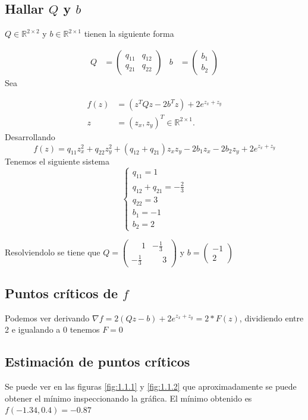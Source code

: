 \documentclass{endm}
\begin{document}
\subsection{Hallar $Q$ y $b$}
$Q \in \mathbb{R}^{2\times2}$ y $b \in \mathbb{R}^{2\times1}$ tienen la siguiente forma

\begin{align}
    Q &= \begin{pmatrix} q_{11} & q_{12} \\ q_{21} & q_{22} \end{pmatrix} & b &= \begin{pmatrix} b_1 \\ b_2 \end{pmatrix}
\end{align}
Sea

\begin{align} 
    f(z) &= (z^{T}Qz - 2b^{T}z) + 2e^{z_x+z_y} \\
    z &= (z_x,z_y)^T \in \mathbb{R}^{2\times1}.
\end{align}
Desarrollando
\begin{equation}
    f(z) = q_{11}z_x^2 + q_{22}z_y^2 + (q_{12} + q_{21})z_x z_y - 2b_1 z_x - 2b_2z_y + 2e^{z_x+z_y}
\end{equation}
Tenemos el siguiente sistema
\begin{equation}
\begin{cases}
q_{11} = 1 \\
q_{12} + q_{21} = -\frac{2}{3} \\
q_{22} = 3 \\
b_1 = -1 \\
b_2 = 2
\end{cases}
\end{equation}

Resolviendolo se tiene que
$Q =  \begin{pmatrix} \phantom{-}1 & -\frac{1}{3} \\ -\frac{1}{3} & \phantom{-}3\end{pmatrix} $
y
$b = \begin{pmatrix} -1\\ 2 \end{pmatrix}$
\subsection{Puntos críticos de $f$}
Podemos ver derivando $\nabla f = 2(Qz -b)+ 2e^{z_x+z_y} = 2*F(z)$, dividiendo entre 2 e igualando a 0 tenemos $ F = 0 $
\subsection{Estimación de puntos críticos}
Se puede ver en las figuras  \ref{fig:1.1.1} y \ref{fig:1.1.2} que aproximadamente se puede obtener el mínimo inspeccionando la gráfica. El mínimo obtenido es $f(-1.34,0.4)= -0.87$
\end{document}
